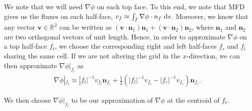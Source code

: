 \documentclass[12pt]{article}
\begin{document}
We note that we will need $\nabla \phi$ on each top face. To this end, we note that MFD gives us the fluxes on each half-face, $v_{f} \approx \int_{f} \nabla \phi \cdot n_{f} \, \operatorname{d}\! s$.
Moreover, we know that any vector $\bm{v} \in \mathbb{R}^2$ can be written as $(\bm{v}\cdot\bm{n}_1) \bm{n}_1 + (\bm{v}\cdot\bm{n}_2) \bm{n}_2$,
where $\bm{n}_1$ and $\bm{n}_2$ are two orthogonal vectors of unit length.
Hence, in order to approximate $\nabla \phi$ on a top half-face $f_t$, we choose the corresponding right and left half-faces $f_r$ and $f_l$ sharing the same cell.
If we are not altering the grid in the $x$-direction, we can then approximate $\nabla \phi|_{f_t}$ as
\begin{align*}
    \nabla \phi|_{f_t} \approx |f_t|^{-1} v_{f_t} \bm{n}_{f_t} + \frac{1}{2}(|f_l|^{-1}v_{f_l}-|f_r|^{-1}v_{f_r})\bm{n}_{f_r}.
\end{align*}

We then choose $\nabla \phi|_{f_t}$ to be our approximation of $\nabla \phi$ at the centroid of $f_t$.
\end{document}
